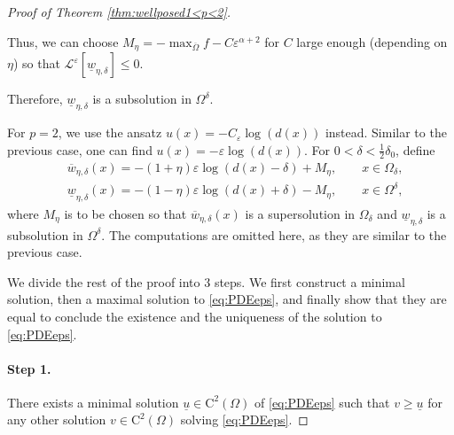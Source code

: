 \documentclass[12pt,reqno]{amsart}
\numberwithin{figure}{section}
\theoremstyle{plain}
\theoremstyle{remark}
\numberwithin{equation}{section}
\begin{document}
\begin{proof} [Proof of Theorem \ref{thm:wellposed1<p<2}]
\begin{itemize}
     Thus, we can choose $M_\eta = -\max_{\overline{\Omega}} f - C\varepsilon^{\alpha+2}$ for $C$ large enough (depending on $\eta$) so that $\mathcal{L}^\varepsilon\left[\underline{w}_{\eta,\delta}\right]\leq 0$.
\end{itemize}
Therefore, $\underline{w}_{\eta,\delta}$ is a subsolution in $\Omega^\delta$.

For $p=2$, we use the ansatz $u(x) = -C_\varepsilon \log(d(x))$ instead. Similar to the previous case, one can find $u(x) = -\varepsilon\log(d(x))$. For $0<\delta<\frac{1}{2}\delta_0$,  define 
\begin{equation*}
    \begin{split}
        &\overline{w}_{\eta,\delta}(x) = -(1+\eta)\varepsilon\log(d(x)-\delta) + M_\eta, \qquad x\in \Omega_\delta,\\
        &\underline{w}_{\eta,\delta}(x) = -(1-\eta)\varepsilon\log(d(x)+\delta) - M_\eta, \qquad x\in \Omega^\delta,
    \end{split}
\end{equation*}
where $M_\eta$ is to be chosen so that $\overline{w}_{\eta,\delta}(x)$ is a supersolution in $\Omega_\delta$ and $\underline{w}_{\eta,\delta}$ is a subsolution in $\Omega^\delta$. The computations are omitted here, as they are similar to the previous case.
\smallskip

\noindent We divide the rest of the proof into 3 steps. We first construct a minimal solution, then a maximal solution to \eqref{eq:PDEeps}, and finally show that they are equal to conclude the existence and the uniqueness of the solution to \eqref{eq:PDEeps}.
\smallskip

\paragraph{\textbf{Step 1.}} There exists a minimal solution $\underline{u}\in \mathrm{C}^2(\Omega)$ of \eqref{eq:PDEeps} such that $v\geq \underline{u}$ for any other solution $v\in \mathrm{C}^2(\Omega)$ solving \eqref{eq:PDEeps}.


\end{proof}
\end{document}
